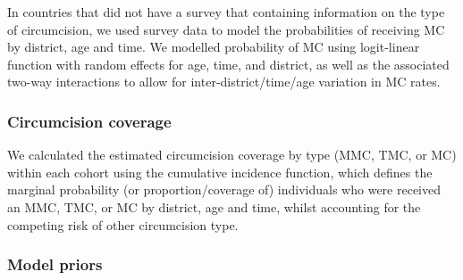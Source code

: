 \documentclass{article}
\begin{document}

In countries that did not have a survey that containing information on the type of circumcision, we used survey data to model the probabilities of receiving MC  by district, age and time. We modelled probability of MC using logit-linear function with random effects for age, time, and district, as well as the associated two-way interactions to allow for inter-district/time/age variation in MC rates. 


\subsubsection*{Circumcision coverage}


We calculated the estimated circumcision coverage by type (MMC, TMC, or MC) within each cohort using the cumulative incidence function, which defines the marginal probability (or proportion/coverage of) individuals who were received an MMC, TMC, or MC by district, age and time, whilst accounting for the competing risk of other circumcision type.



\subsubsection*{Model priors}

\end{document}
